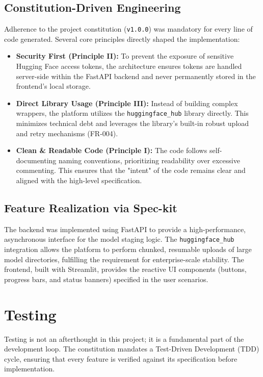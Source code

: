 \documentclass[a4paper,12pt]{report}
\begin{document}
\subsection{Constitution-Driven Engineering}
Adherence to the project constitution (\texttt{v1.0.0}) was mandatory for every line of code generated. Several core principles directly shaped the implementation:
\begin{itemize}
    \item \textbf{Security First (Principle II):} To prevent the exposure of sensitive Hugging Face access tokens, the architecture ensures tokens are handled server-side within the FastAPI backend and never permanently stored in the frontend's local storage.
    \item \textbf{Direct Library Usage (Principle III):} Instead of building complex wrappers, the platform utilizes the \texttt{huggingface\_hub} library directly. This minimizes technical debt and leverages the library's built-in robust upload and retry mechanisms (FR-004).
    \item \textbf{Clean \& Readable Code (Principle I):} The code follows self-documenting naming conventions, prioritizing readability over excessive commenting. This ensures that the "intent" of the code remains clear and aligned with the high-level specification.
\end{itemize}

\subsection{Feature Realization via Spec-kit}
The backend was implemented using FastAPI to provide a high-performance, asynchronous interface for the model staging logic. The \texttt{huggingface\_hub} integration allows the platform to perform chunked, resumable uploads of large model directories, fulfilling the requirement for enterprise-scale stability. The frontend, built with Streamlit, provides the reactive UI components (buttons, progress bars, and status banners) specified in the user scenarios.

\section{Testing}
Testing is not an afterthought in this project; it is a fundamental part of the development loop. The constitution mandates a Test-Driven Development (TDD) cycle, ensuring that every feature is verified against its specification before implementation.
\end{document}

